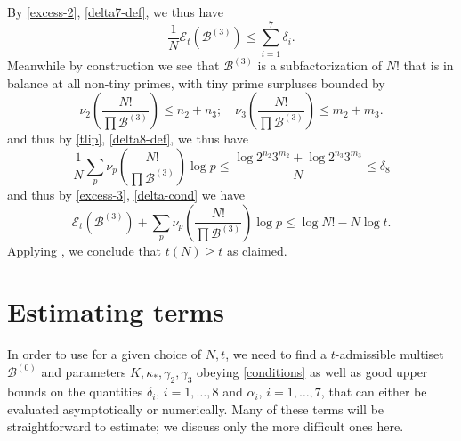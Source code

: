 \documentclass[10pt,a4paper,reqno]{amsart}
\numberwithin{equation}{section}
\theoremstyle{plain}
\theoremstyle{definition}
\newcommand\tuple{{\mathcal B}}
\newcommand\excess{{\mathcal{E}}}
\begin{document}
By \eqref{excess-2}, \eqref{delta7-def}, we thus have
\begin{equation}\label{excess-3}
 \frac{1}{N} \excess_t(\tuple^{(3)}) \leq \sum_{i=1}^7 \delta_i.
\end{equation}
Meanwhile by construction we see that $\tuple^{(3)}$ is a subfactorization of $N!$ that is in balance at all non-tiny primes, with tiny prime surpluses bounded by
$$ \nu_2\left( \frac{N!}{\prod \tuple^{(3)}}\right) \leq n_2+n_3; \quad \nu_3\left( \frac{N!}{\prod \tuple^{(3)}}\right) \leq m_2+m_3.$$
and thus by \eqref{tlip}, \eqref{delta8-def}, we thus have
$$ \frac{1}{N} \sum_p \nu_p\left( \frac{N!}{\prod \tuple^{(3)}}\right) \log p \leq \frac{\log 2^{n_2} 3^{m_2} + \log 2^{n_3} 3^{m_3}}{N} \leq \delta_8$$
and thus by \eqref{excess-3}, \eqref{delta-cond} we have
$$ \excess_t(\tuple^{(3)}) + \sum_p \nu_p\left( \frac{N!}{\prod \tuple^{(3)}}\right) \log p \leq \log N! - N \log t.$$
Applying , we conclude that $t(N) \geq t$ as claimed.

\FloatBarrier

\section{Estimating terms}\label{construction-sec}

In order to use  for a given choice of $N,t$, we need to find a $t$-admissible multiset $\tuple^{(0)}$ and parameters $K, \kappa_*, \gamma_2, \gamma_3$ obeying \eqref{conditions} as well as good upper bounds on the quantities $\delta_i$, $i=1,\dots,8$ and $\alpha_i$, $i=1,\dots,7$, that can either be evaluated asymptotically or numerically.  Many of these terms will be straightforward to estimate; we discuss only the more difficult ones here.
\end{document}

